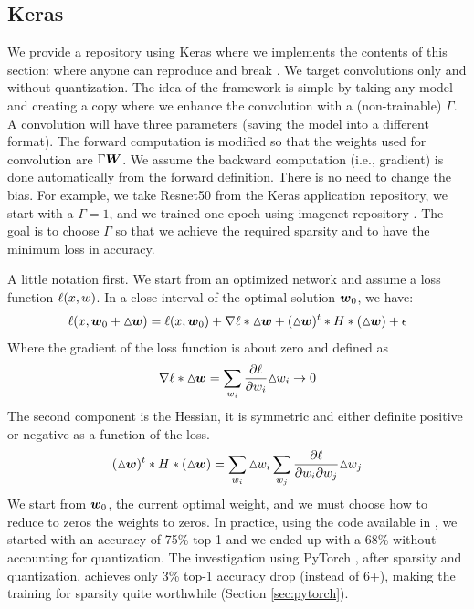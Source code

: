 \documentclass[conference]{IEEEtran}
\begin{document}
\subsection{Keras}
We provide a repository using Keras \cite{chollet2015keras} where we
implements the contents of this section: where anyone can reproduce
and break \cite{PaoloK2020}. We target convolutions only and without
quantization. The idea of the framework is simple by taking any model
and creating a copy where we enhance the convolution with a
(non-trainable) $\Gamma$. A convolution will have three parameters
(saving the model into a different format).  The forward computation
is modified so that the weights used for convolution are
$\Gamma{\boldsymbol W}$. We assume the backward computation (i.e., gradient) is
done automatically from the forward definition. There is no need to
change the bias. For example, we take Resnet50 from the Keras
application repository, we start with a $\Gamma=1$, and we trained one
epoch using imagenet repository \cite{deng2009imagenet}.  The goal is
to choose $\Gamma$ so that we achieve the required sparsity and to
have the minimum loss in accuracy.

A little notation first. We start from an optimized network and assume
a loss function ${\bf \ell}(x,w)$.  In a close interval of the optimal
solution ${\boldsymbol w}_0$, we have:
\begin{equation}
  \label{eq:loss}
  {\bf \ell}(x,\Vc{w}_0 +\Triangle{\Vc{w})} = {\bf \ell}(x,\Vc{w}_0) +
  \nabla{\bf \ell}*\Triangle{\Vc{w}} + (\Triangle{\Vc{w}})^t *H*
  (\Triangle{\Vc{w}}) + \epsilon
\end{equation}
Where the gradient of the loss function is about zero and defined as
\begin{equation}
  \nabla{\bf \ell}* {\vartriangle\!\! {\boldsymbol w} } = \sum_{w_i}
  \frac{\partial\ell}{\partial w_i} {\vartriangle\!\! w_i } \rightarrow 0
\end{equation}
The second component is the Hessian, it is symmetric and either
definite positive or negative as a function of the loss.
\begin{equation}
  (\Triangle{\Vc{w}})^t *H*(\Triangle{\Vc{w}}) = \sum_{w_i}
  \Triangle{w_i} \sum_{w_j} \frac{\partial\ell}{\partial w_i\partial
    w_j} \Triangle{w_j}
\end{equation}
We start from ${\boldsymbol w}_0$, the current optimal weight, and we must
choose how to reduce to zeros the weights to zeros. In practice, using
the code available in \cite{PaoloK2020}, we started with an accuracy
of 75\% top-1 and we ended up with a 68\% without accounting for
quantization. The investigation using PyTorch \cite{pytorch_paper},
after sparsity and quantization, achieves only 3\% top-1 accuracy drop
(instead of 6+), making the training for sparsity quite worthwhile
(Section \ref{sec:pytorch}).
\end{document}

